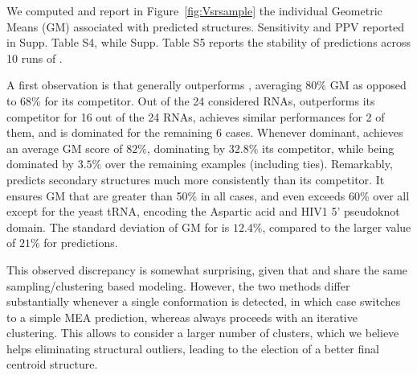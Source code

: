 \documentclass[a4,center,fleqn]{NAR}
\begin{document}
We computed and report in Figure~\ref{fig:Vsrsample} the individual Geometric Means (GM) associated with predicted structures. Sensitivity and PPV reported in Supp. Table S4, while Supp. Table S5 reports the stability of predictions across 10 runs of \OurTool.


A first observation is that \OurTool generally outperforms , averaging $80\%$ GM as opposed to $68\%$ for its competitor. 
Out of the 24 considered RNAs, \OurTool outperforms its competitor for 16 out of the 24 RNAs, achieves similar performances for 2 of them, and is dominated for the remaining 6 cases. Whenever dominant, \OurTool achieves an average GM score of $82\%$, dominating by $32.8\%$ its competitor, while being dominated by $3.5\%$ over the remaining examples (including ties). 
Remarkably, \OurTool predicts secondary structures much more consistently than its competitor. 
It ensures GM that are greater than 50\% in all cases, and even exceeds 60\% over all except for the yeast tRNA, encoding the Aspartic acid and HIV1 5' pseudoknot domain. The standard deviation of GM for \OurTool is $12.4\%$, compared to the larger value of $21\%$ for  predictions.





This observed discrepancy is somewhat surprising, given that \OurTool and  share the same sampling/clustering based modeling. However, the two methods differ substantially whenever a single conformation is detected, in which case  switches to a simple MEA prediction, whereas \OurTool{} always proceeds with an iterative clustering. This allows \OurTool{} to consider a larger number of clusters, which we believe helps eliminating structural outliers, leading to the election of a better final centroid structure. 
\end{document}
